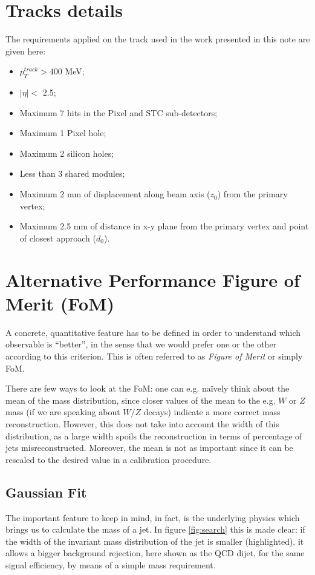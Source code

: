 \section{Tracks details}
The requirements applied on the track used in the work presented in this note are given here:
\begin{itemize}
 \item $p_T^{track} > 400$ MeV;
 \item $|\eta|<$ 2.5;
 \item Maximum 7 hits in the Pixel and STC sub-detectors;
 \item Maximum 1 Pixel hole;
 \item Maximum 2 silicon holes;
 \item Less than 3 shared modules;
 \item Maximum 2 mm of displacement along beam axis ($z_0$) from the primary vertex;
 \item Maximum 2.5 mm of distance in x-y plane from the primary vertex and point of closest approach ($d_0$).
\end{itemize}

\section{Alternative Performance Figure of Merit (FoM)}

A concrete, quantitative feature has to be defined in order to understand which observable is ``better'', in the sense that we would prefer one or the other according to this criterion. This is often referred to as \textit{Figure of Merit} or simply FoM.

There are few ways to look at the FoM: one can e.g. na\"ively think about the mean of the mass distribution, since closer values of the mean to the e.g. $W$ or $Z$ mass (if we are speaking about $W/Z$ decays) indicate a more correct mass reconstruction. However, this does not take into account the width of this distribution, as a large width spoils the reconstruction in terms of percentage of jets misreconstructed. Moreover, the mean is not as important since it can be rescaled to the desired value in a calibration procedure.

\subsection{Gaussian Fit}

The important feature to keep in mind, in fact, is the underlying physics which brings us to calculate the mass of a jet. In figure \ref{fig:search} this is made clear: if the width of the invariant mass distribution of the jet is smaller (highlighted), it allows a bigger background rejection, here shown as the QCD dijet, for the same signal efficiency, by means of a simple mass requirement.

